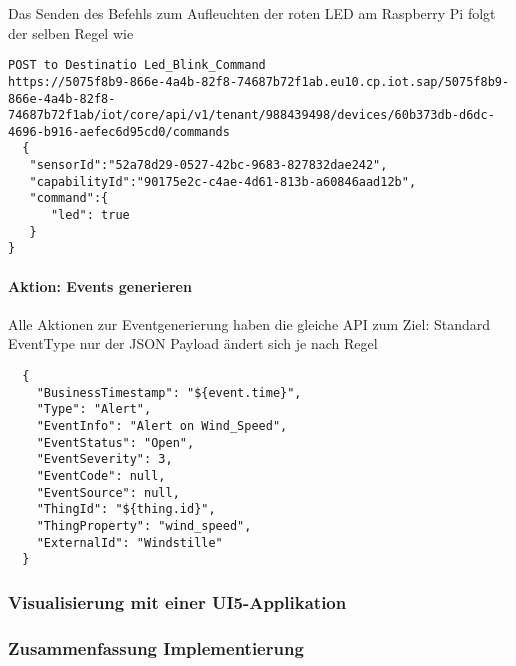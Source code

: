 Das Senden des Befehls zum Aufleuchten der roten LED am Raspberry Pi folgt der selben Regel wie

\begin{lstlisting}
POST to Destinatio Led_Blink_Command
https://5075f8b9-866e-4a4b-82f8-74687b72f1ab.eu10.cp.iot.sap/5075f8b9-866e-4a4b-82f8-74687b72f1ab/iot/core/api/v1/tenant/988439498/devices/60b373db-d6dc-4696-b916-aefec6d95cd0/commands
  {
   "sensorId":"52a78d29-0527-42bc-9683-827832dae242",
   "capabilityId":"90175e2c-c4ae-4d61-813b-a60846aad12b",
   "command":{
      "led": true
   }
}
\end{lstlisting}


\paragraph{Aktion: Events generieren}
Alle Aktionen zur Eventgenerierung haben die gleiche API zum Ziel: Standard EventType nur der JSON Payload ändert sich je nach Regel

\begin{lstlisting}
  {
    "BusinessTimestamp": "${event.time}",
    "Type": "Alert",
    "EventInfo": "Alert on Wind_Speed",
    "EventStatus": "Open",
    "EventSeverity": 3,
    "EventCode": null,
    "EventSource": null,
    "ThingId": "${thing.id}",
    "ThingProperty": "wind_speed",
    "ExternalId": "Windstille"
  }
\end{lstlisting}


\subsubsection{Visualisierung mit einer UI5-Applikation}


\subsubsection{Zusammenfassung Implementierung}

\newpage
